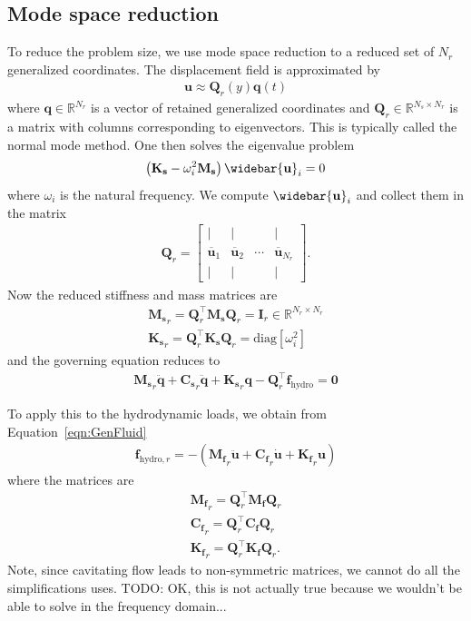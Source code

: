 \documentclass[10pt]{article}
\newcommand{\mbf}[1]{\mathbf{#1}}
\newcommand{\be}{\begin{eqnarray}}
\newcommand{\ee}{\end{eqnarray}}
\newcommand{\tn}[1]{\textrm{#1}}
\begin{document}
% 
\subsection{Mode space reduction}
%
To reduce the problem size, we use mode space reduction to a reduced set of $N_r$ generalized coordinates.
The displacement field is approximated by
%
\be
\mbf{u} \approx \mbf{Q}_r(y) \mbf{q}(t)
\ee
%
where $\mbf{q} \in \mathbb{R}^{N_r}$ is a vector of retained generalized coordinates and $\mbf{Q}_r \in \mathbb{R}^{N_s \times N_r}$ is a matrix with columns corresponding to eigenvectors.
This is typically called the normal mode method.
One then solves the eigenvalue problem
%
\be
\left( \mbf{K_s} - \omega_i^2 \mbf{M_s}
\right)
\widebar{  \mbf{u} }_i = 0
\ee
%
where $\omega_i$ is the natural frequency.
We compute $\widebar{  \mbf{u} }_i$ and collect them in the matrix
%
\be
\mbf{Q}_r=\left[\begin{array}{cccc}
		\mid                 & \mid                 &        & \mid                     \\
		\overline{\mbf{u}}_1 & \overline{\mbf{u}}_2 & \cdots & \overline{\mbf{u}}_{N_r} \\
		\mid                 & \mid                 &        & \mid
	\end{array}\right]
.
\ee
%
Now the reduced stiffness and mass matrices are
%
\be
\mbf{M_s}_r = \mbf{Q}_r^{\top} \mbf{M_s} \mbf{Q}_r = \mbf{I}_r \in \mathbb{R}^{N_r \times N_r} \\
\mbf{K_s}_r = \mbf{Q}_r^{\top} \mbf{K_s} \mbf{Q}_r = \tn{diag}\left[ \omega_i^2   \right]
\ee
%
and the governing equation reduces to
%
\be
\mbf{M_s}_r \ddot{\mbf{q}} + \mbf{C_s}_r \ddot{\mbf{q}} + \mbf{K_s}_r \mbf{q} - \mbf{Q}_r^{\top} \mbf{f}_{\tn{hydro}} = \mbf{0}
\ee
%

To apply this to the hydrodynamic loads, we obtain from Equation~\eqref{eqn:GenFluid}
%
\be
\mbf{f}_{\tn{hydro},r} =
-\left( \mbf{M_f}_r \ddot{\mbf{u}} + \mbf{C_f}_r \dot{\mbf{u}} + \mbf{K_f}_r \mbf{u}\right)
\ee
%
where the matrices are
%
\be
\mbf{M_f}_r = \mbf{Q}_r^{\top} \mbf{M_f} \mbf{Q}_r \\
\mbf{C_f}_r = \mbf{Q}_r^{\top} \mbf{C_f} \mbf{Q}_r \\
\mbf{K_f}_r = \mbf{Q}_r^{\top} \mbf{K_f} \mbf{Q}_r.
\ee
Note, since cavitating flow leads to non-symmetric matrices, we cannot do all the simplifications \citet{Jonsson2017a} uses.
TODO: OK, this is not actually true because we wouldn't be able to solve in the frequency domain...

\end{document}
